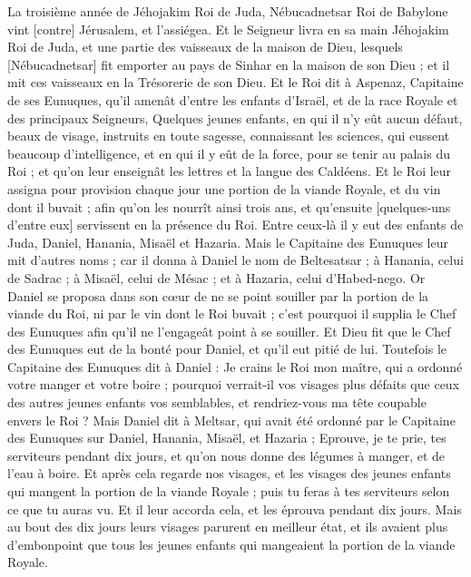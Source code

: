 \BFont
\begin{multicols}{2}
\VerseOne{}La troisième année de Jéhojakim Roi de Juda, Nébucadnetsar Roi de Babylone vint [contre] Jérusalem, et l'assiégea.
Et le Seigneur livra en sa main Jéhojakim Roi de Juda, et une partie des vaisseaux de la maison de Dieu, lesquels [Nébucadnetsar] fit emporter au pays de Sinhar en la maison de son Dieu ; et il mit ces vaisseaux en la Trésorerie de son Dieu.
Et le Roi dit à Aspenaz, Capitaine de ses Eunuques, qu'il amenât d'entre les enfants d'Israël, et de la race Royale et des principaux Seigneurs,
Quelques jeunes enfants, en qui il n'y eût aucun défaut, beaux de visage, instruits en toute sagesse, connaissant les sciences, qui eussent beaucoup d'intelligence, et en qui il y eût de la force, pour se tenir au palais du Roi ; et qu'on leur enseignât les lettres et la langue des Caldéens.
Et le Roi leur assigna pour provision chaque jour une portion de la viande Royale, et du vin dont il buvait ; afin qu'on les nourrît ainsi trois ans, et qu'ensuite [quelques-uns d'entre eux] servissent en la présence du Roi.
Entre ceux-là il y eut des enfants de Juda, Daniel, Hanania, Misaël et Hazaria.
Mais le Capitaine des Eunuques leur mit d'autres noms ; car il donna à Daniel le nom de Beltesatsar ; à Hanania, celui de Sadrac ; à Misaël, celui de Mésac ; et à Hazaria, celui d'Habed-nego.
Or Daniel se proposa dans son cœur de ne se point souiller par la portion de la viande du Roi, ni par le vin dont le Roi buvait ; c'est pourquoi il supplia le Chef des Eunuques afin qu'il ne l'engageât point à se souiller.
Et Dieu fit que le Chef des Eunuques eut de la bonté pour Daniel, et qu'il eut pitié de lui.
Toutefois le Capitaine des Eunuques dit à Daniel : Je crains le Roi mon maître, qui a ordonné votre manger et votre boire ; pourquoi verrait-il vos visages plus défaits que ceux des autres jeunes enfants vos semblables, et rendriez-vous ma tête coupable envers le Roi ?
Mais Daniel dit à Meltsar, qui avait été ordonné par le Capitaine des Eunuques sur Daniel, Hanania, Misaël, et Hazaria ;
Eprouve, je te prie, tes serviteurs pendant dix jours, et qu'on nous donne des légumes à manger, et de l'eau à boire.
Et après cela regarde nos visages, et les visages des jeunes enfants qui mangent la portion de la viande Royale ; puis tu feras à tes serviteurs selon ce que tu auras vu.
Et il leur accorda cela, et les éprouva pendant dix jours.
Mais au bout des dix jours leurs visages parurent en meilleur état, et ils avaient plus d'embonpoint que tous les jeunes enfants qui mangeaient la portion de la viande Royale.

\end{multicols}
